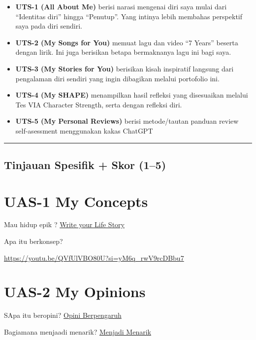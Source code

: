 \documentclass[
  letterpaper,
  DIV=11,
  numbers=noendperiod]{scrreprt}
\providecommand{\tightlist}{%
  \setlength{\itemsep}{0pt}\setlength{\parskip}{0pt}}
\begin{document}
\begin{itemize}
\tightlist
\item
  \textbf{UTS-1 (All About Me)} berisi narasi mengenai diri saya mulai
  dari ``Identitas diri'' hingga ``Penutup''. Yang intinya lebih
  membahas perspektif saya pada diri sendiri.
\item
  \textbf{UTS-2 (My Songs for You)} memuat lagu dan video ``7 Years''
  beserta dengan lirik. Ini juga berisikan betapa bermaknanya lagu ini
  bagi saya.
\item
  \textbf{UTS-3 (My Stories for You)} berisikan kisah inspiratif
  langsung dari pengalaman diri sendiri yang ingin dibagikan melalui
  portofolio ini.
\item
  \textbf{UTS-4 (My SHAPE)} menampilkan hasil refleksi yang disesuaikan
  melalui Tes VIA Character Strength, serta dengan refleksi diri.
\item
  \textbf{UTS-5 (My Personal Reviews)} berisi metode/tautan panduan
  review self-asessment menggunakan kakas ChatGPT
\end{itemize}

\begin{center}\rule{0.5\linewidth}{0.5pt}\end{center}

\section{Tinjauan Spesifik + Skor
(1--5)}\label{tinjauan-spesifik-skor-15}


\chapter{UAS-1 My Concepts}\label{uas-1-my-concepts}

Mau hidup epik ? \href{lifestory.pdf}{Write your Life Story}

Apa itu berkonsep?

\url{https://youtu.be/QVfUlVBO80U?si=yM6q_rwV9rcDBbu7}


\chapter{UAS-2 My Opinions}\label{uas-2-my-opinions}

SApa itu beropini? \href{BM\%20Opini.mp4}{Opini Berpengaruh}

Bagiamana menjaadi menarik? \href{./Interesting.mp4}{Menjadi Menarik}
\end{document}
